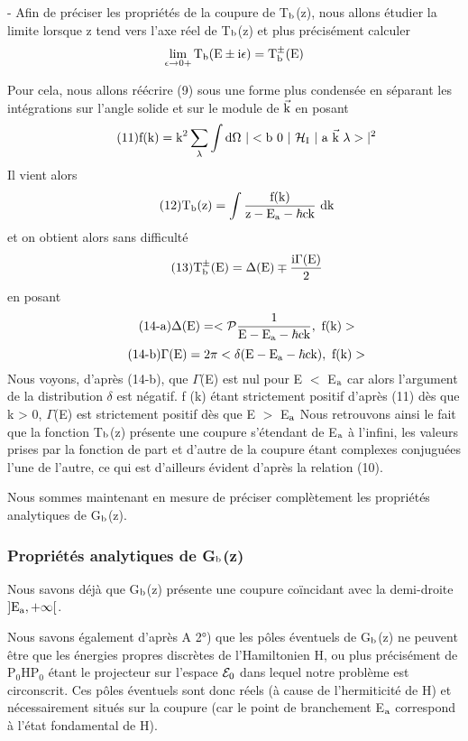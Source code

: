- Afin de préciser les propriétés de la coupure de T$_{\text{b}}$(z),
nous allons étudier la limite lorsque z tend vers l'axe réel de T$_{\text{b}}$(z) et plus précisément calculer
\[
\lim_{\epsilon\to 0+}\text{T}_{\text{b}}(\text{E}\pm\text{i}\epsilon)=\text{T}_{\text{b}}^\pm(\text{E})
\]

Pour cela, nous allons réécrire (9) sous une forme plus condensée
en séparant les intégrations sur l'angle solide et sur le module de $\vec{\text{k}}$ en posant
\[
\tag{11}\mt{f(k)}=\mt{k}^2\sum_\lambda\int\mt{d}\Omega\ |<\mt{b 0 }|\ \mc{H}_\mt{I}\ |\mt{ a }\vec{\mt{k}}\ \lambda> |^2
\]
Il vient alors
\[
\tag{12}\text{T}_{\text{b}}(\text{z})=\int\frac{\text{f(k)}}
{\text{z}-\text{E}_{\text{a}}-\hbar\text{ck}}\ \text{dk}
\]
et on obtient alors sans difficulté
\[
\tag{13}\text{T}_{\text{b}}^\pm(\text{E})=\Delta(\text{E})\mp\frac{\text{i}\Gamma(\text{E})}{2}
\]
en posant
\[
\tag{14-a}\Delta(\text{E})=<\mathcal{P}\frac{1}
{\text{E}-\text{E}_{\text{a}}-\hbar\text{ck}},\text{ f(k)}>
\]
\[
\tag{14-b}\Gamma(\text{E})=2\pi<\delta
(\text{E}-\text{E}_{\text{a}}-\hbar\text{ck}),\text{ f(k)}>
\]
Nous voyons, d'après (14-b), que $\Gamma$(E) est nul pour E $<$ E$_{\text{a}}$ car
alors l'argument de la distribution $\delta$ est négatif. f (k) étant strictement
positif d'après (11) dès que k > 0, $\Gamma$(E) est strictement positif dès que
E $>$ E$_{\text{a}}$ Nous retrouvons ainsi le fait que la fonction T$_{\text{b}}$(z) présente une
coupure s'étendant de E$_{\text{a}}$ à l'infini, les valeurs prises par la fonction de
part et d'autre de la coupure étant complexes conjuguées l'une de l'autre,
ce qui est d'ailleurs évident d'après la relation (10).

Nous sommes maintenant en mesure de préciser complètement les
propriétés analytiques de G$_{\text{b}}$(z).

\subsubsection{Propriétés analytiques de G$_{\text{b}}$(z)}%
Nous savons déjà que G$_{\text{b}}$(z) présente une coupure coïncidant
avec la demi-droite $]\text{E}_{\text{a}},+\infty[$.

Nous savons également d'après A 2°) que les pôles éventuels de
G$_{\text{b}}$(z) ne peuvent être que les énergies propres discrètes de l'Hamiltonien H,
ou plus précisément de P$_0$HP$_0$ étant le projecteur sur l'espace $\mathcal{E}_0$
dans lequel notre problème est circonscrit. Ces pôles éventuels sont donc réels
(à cause de l'hermiticité de H) et nécessairement situés sur la coupure (car
le point de branchement E$_{\text{a}}$ correspond à l'état fondamental de H).

